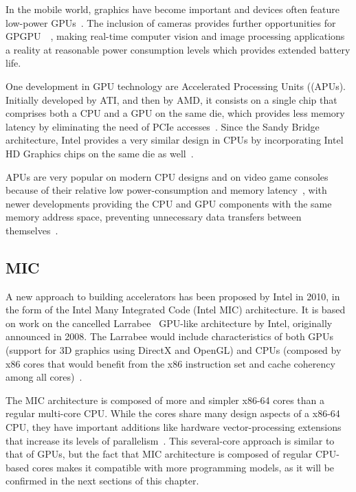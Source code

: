 In the mobile world, graphics have become important and devices often feature low-power GPUs~\cite{cheng2011using}. The inclusion of cameras provides further opportunities for GPGPU~\cite{wang2013accelerating}~\cite{rister2013fast}, making real-time computer vision and image processing applications a reality at reasonable power consumption levels which provides extended battery life.

One development in GPU technology are Accelerated Processing Units ((\gls{APU}s). Initially developed by ATI, and then by AMD, it consists on a single chip that comprises both a CPU and a GPU on the same die, which provides less memory latency by eliminating the need of PCIe accesses~\cite{daga2011efficacy}. Since the Sandy Bridge architecture, Intel provides a very similar design in CPUs by incorporating Intel HD Graphics chips on the same die as well~\cite{yuffe2011fully}.

APUs are very popular on modern CPU designs and on video game consoles because of their relative low power-consumption and memory latency~\cite{9_wikipedia_2015}, with newer developments providing the CPU and GPU components with the same memory address space, preventing unnecessary data transfers between themselves~\cite{10_wikipedia_2015}.

\subsection{MIC}

A new approach to building accelerators has been proposed by Intel in 2010, in the form of the Intel Many Integrated Code (Intel MIC) architecture. It is based on work on the cancelled Larrabee~\cite{seiler2008larrabee} GPU-like architecture by Intel, originally announced in 2008. The Larrabee would include characteristics of both GPUs (support for 3D graphics using DirectX and OpenGL) and CPUs (composed by x86 cores that would benefit from the x86 instruction set and cache coherency among all cores)~\cite{seiler2008larrabee}.

The MIC architecture is composed of more and simpler x86-64 cores than a regular multi-core CPU. While the cores share many design aspects of a x86-64 CPU, they have important additions like hardware vector-processing extensions that increase its levels of parallelism~\cite{chrysos2014intel}. This several-core approach is similar to that of GPUs, but the fact that MIC architecture is composed of regular CPU-based cores makes it compatible with more programming models, as it will be confirmed in the next sections of this chapter.

